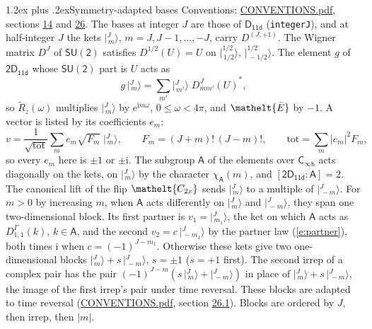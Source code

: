 \documentclass[10pt,a4paper]{article}
\makeatletter
\renewcommand\section{\@startsection{section}{1}{\z@}{-3ex plus -1ex minus -.2ex}%
  {1.2ex plus .2ex}{\normalfont\large\sffamily\bfseries\color{parttitle}}}
\numberwithin{equation}{section}
\newcommand{\eltfont}[1]{{\let\sigma\eltsigma\mathelt{#1}}}
\newcommand{\grp}[1]{\mathsf{#1}}
\newcommand{\elt}[1]{\eltfont{#1}}
\newcommand{\grpindex}[2]{[#1 : #2]}
\newcommand{\iunit}{\mathrm{i}}
\newcommand{\expe}{\mathrm{e}}
\newcommand{\irrJp}[2]{D^{(#1,#2)}}
\newcommand{\repD}[1]{D^{#1}}
\newcommand{\wignerD}[1]{D^{#1}}
\newcommand{\chiA}{\chi_{\grp{A}}}
\newcommand{\conj}[1]{{#1}^{*}}
\newcommand{\jm}[2]{\bigl\lvert{}^{#1}_{\,#2}\bigr\rangle}
\newcommand{\barred}[1]{\bar{#1}}
\newcommand{\lift}[1]{\tilde{#1}}
\makeatother
\begin{document}
\section{Symmetry-adapted bases}\label{s:bases}
Conventions: \href{../../CONVENTIONS.pdf}{CONVENTIONS.pdf}, sections \href{../../../rotation/CONVENTIONS.pdf\#conv.14}{14} and \href{../../CONVENTIONS.pdf\#conv.26}{26}.
\leavevmode\label{n:index.m}\label{n:vector.ket}The bases at integer $J$ are those of \href{../../../rotation/data/pdf/D11d.pdf}{$\grp{D_{11d}}$} (\texttt{integerJ}), and at half-integer $J$ the kets $\jm{J}{m}$, $m = J, J-1, \dots, -J$, carry $\irrJp{J}{+1}$. \label{n:matrix.wigner}The Wigner matrix $\wignerD{J}$ of $\grp{SU(2)}$ satisfies $\wignerD{1/2}(U) = U$ on $\jm{1/2}{1/2}$, $\jm{1/2}{-1/2}$. The element $g$ of $\grp{2D_{11d}}$ whose $\grp{SU(2)}$ part is $U$ acts as
\begin{equation}\label{e:action}g\,\jm{J}{m} = \sum_{m'} \jm{J}{m'}\; \conj{\wignerD{J}_{m m'}(U)},\end{equation}
so $\lift{R}_{z}(\omega)$ multiplies $\jm{J}{m}$ by $\expe^{\iunit m\omega}$, $0 \le \omega < 4\pi$, and $\elt{\barred{E}}$ by $-1$. \label{n:index.ketcoefficient}\label{n:vector.basis.symmetry}\label{n:index.ketweight}\label{n:index.total}A vector is listed by its coefficients $e_m$:
\begin{equation}\label{e:ket}v = \frac{1}{\sqrt{\mathrm{tot}}}\sum_m e_m\sqrt{F_m}\;\jm{J}{m},\qquad F_m = (J+m)!\,(J-m)!,\qquad \mathrm{tot} = \sum_m |e_m|^2F_m,\end{equation}
so every $e_m$ here is $\pm 1$ or $\pm\iunit$.
\leavevmode\label{n:group.A}\label{n:function.character.abelian}The subgroup $\grp{A}$ of the elements over $\grp{C_{\infty h}}$ acts diagonally on the kets, on $\jm{J}{m}$ by the character $\chiA(m)$, and $\grpindex{\grp{2D_{11d}}}{\grp{A}} = 2$. The canonical lift of the flip $\elt{C_{2x}}$ sends $\jm{J}{m}$ to a multiple of $\jm{J}{-m}$. For $m > 0$ by increasing $m$, when $\grp{A}$ acts differently on $\jm{J}{m}$ and $\jm{J}{-m}$, they span one two-dimensional block. \label{n:index.partner.sign}Its first partner is $v_1 = \jm{J}{m_1}$, the ket on which $\grp{A}$ acts as $\repD{\Gamma}_{1,1}(k)$, $k \in \grp{A}$, and the second $v_2 = c\,\jm{J}{-m_1}$ by the partner law (\ref{e:partner}), both times $\iunit$ when $c = (-1)^{J-m_1}$. \label{n:index.pair.sign}Otherwise these kets give two one-dimensional blocks $\jm{J}{m} + s\,\jm{J}{-m}$, $s = \pm 1$ ($s = +1$ first). The second irrep of a complex pair has the pair $(-1)^{J-m}(s\,\jm{J}{m} + \jm{J}{-m})$ in place of $\jm{J}{m} + s\,\jm{J}{-m}$, the image of the first irrep's pair under time reversal. These blocks are adapted to time reversal (\href{../../CONVENTIONS.pdf}{CONVENTIONS.pdf}, section \href{../../CONVENTIONS.pdf\#conv.26.1}{26.1}). Blocks are ordered by $J$, then irrep, then $|m|$.
\end{document}
